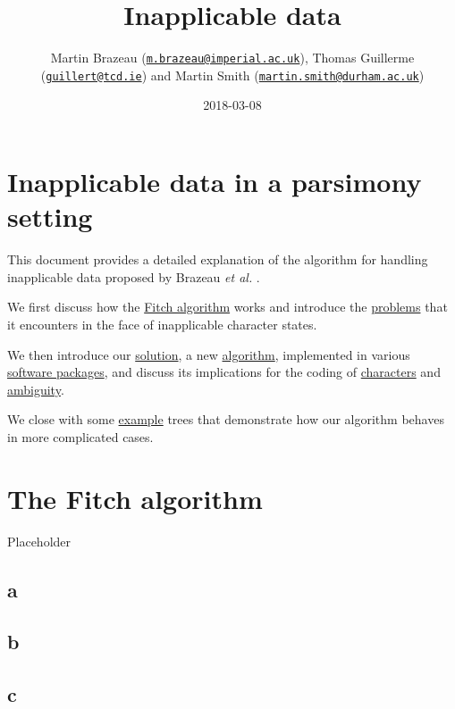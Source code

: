 \documentclass[]{book}
\title{Inapplicable data}
\author{Martin Brazeau
(\href{mailto:m.brazeau@imperial.ac.uk}{\nolinkurl{m.brazeau@imperial.ac.uk}}),
Thomas Guillerme
(\href{mailto:guillert@tcd.ie}{\nolinkurl{guillert@tcd.ie}}) and Martin
Smith
(\href{mailto:martin.smith@durham.ac.uk}{\nolinkurl{martin.smith@durham.ac.uk}})}
\date{2018-03-08}
\theoremstyle{definition}
\theoremstyle{definition}
\theoremstyle{definition}
\theoremstyle{remark}
\begin{document}
\maketitle

{
\setcounter{tocdepth}{1}
\tableofcontents
}
\hypertarget{inapplicable-data-in-a-parsimony-setting}{%
\chapter*{Inapplicable data in a parsimony
setting}\label{inapplicable-data-in-a-parsimony-setting}}

This document provides a detailed explanation of the algorithm for
handling inapplicable data proposed by Brazeau \emph{et al.}
\citeyearpar{ThisStudy}.

We first discuss how the \protect\hyperlink{fitch}{Fitch algorithm}
works and introduce the \protect\hyperlink{problems}{problems} that it
encounters in the face of inapplicable character states.

We then introduce our \protect\hyperlink{solution}{solution}, a new
\protect\hyperlink{algorithm}{algorithm}, implemented in various
\protect\hyperlink{software}{software packages}, and discuss its
implications for the coding of \protect\hyperlink{coding}{characters}
and \protect\hyperlink{ambiguity}{ambiguity}.

We close with some \protect\hyperlink{examples}{example} trees that
demonstrate how our algorithm behaves in more complicated cases.

\hypertarget{fitch}{%
\chapter{The Fitch algorithm}\label{fitch}}

Placeholder

\hypertarget{a}{%
\section{a}\label{a}}

\hypertarget{b}{%
\section{b}\label{b}}

\hypertarget{c}{%
\section{c}\label{c}}
\end{document}
